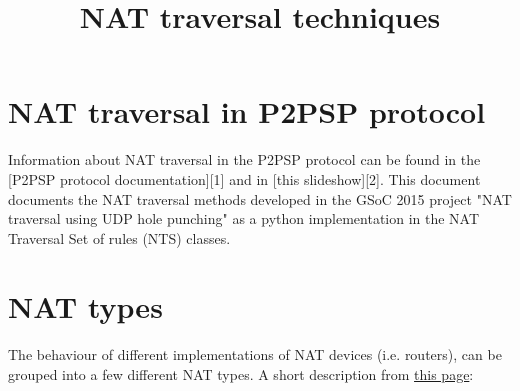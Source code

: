 \documentclass{article}
\title{NAT traversal techniques}
\begin{document}
\maketitle

\section{NAT traversal in P2PSP protocol}

Information about NAT traversal in the P2PSP protocol can be found in
the [P2PSP protocol documentation][1] and in [this slideshow][2].
This document documents the NAT traversal methods developed in the
GSoC 2015 project "NAT traversal using UDP hole punching" as a python
implementation in the NAT Traversal Set of rules (NTS) classes.

\section{NAT types}

The behaviour of different implementations of NAT devices
(i.e. routers), can be grouped into a few different NAT types. A short
description
from \href{https://wiki.asterisk.org/wiki/display/TOP/NAT+Traversal+Testing}{this
page}:
\end{document}
